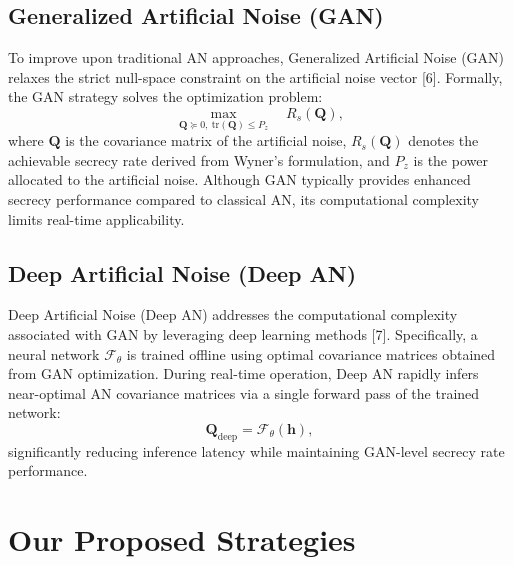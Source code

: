 \documentclass[10pt,a4paper]{article} %
\begin{document}
\subsection{Generalized Artificial Noise (GAN)}
To improve upon traditional AN approaches, Generalized Artificial Noise (GAN)  relaxes the strict null-space constraint on the artificial noise vector [6]. Formally, the GAN strategy solves the optimization problem:
\begin{equation}
\max_{\mathbf{Q} \succeq 0,\ \mathrm{tr}(\mathbf{Q}) \le P_z} \quad R_s(\mathbf{Q}),
\end{equation}
where $\mathbf{Q}$ is the covariance matrix of the artificial noise, $R_s(\mathbf{Q})$ denotes the achievable secrecy rate derived from Wyner's formulation, and $P_z$ is the power allocated to the artificial noise. Although GAN typically provides enhanced secrecy performance compared to classical AN, its computational complexity limits real-time applicability.

\subsection{Deep Artificial Noise (Deep AN)}
Deep Artificial Noise (Deep AN)  addresses the computational complexity associated with GAN by leveraging deep learning methods [7]. Specifically, a neural network $\mathcal{F}_\theta$ is trained offline using optimal covariance matrices obtained from GAN optimization. During real-time operation, Deep AN rapidly infers near-optimal AN covariance matrices via a single forward pass of the trained network:
\[
\mathbf{Q}_\text{deep} = \mathcal{F}_\theta(\mathbf{h}),
\]
significantly reducing inference latency while maintaining GAN-level secrecy rate performance.

\section{Our Proposed Strategies}
\end{document}
